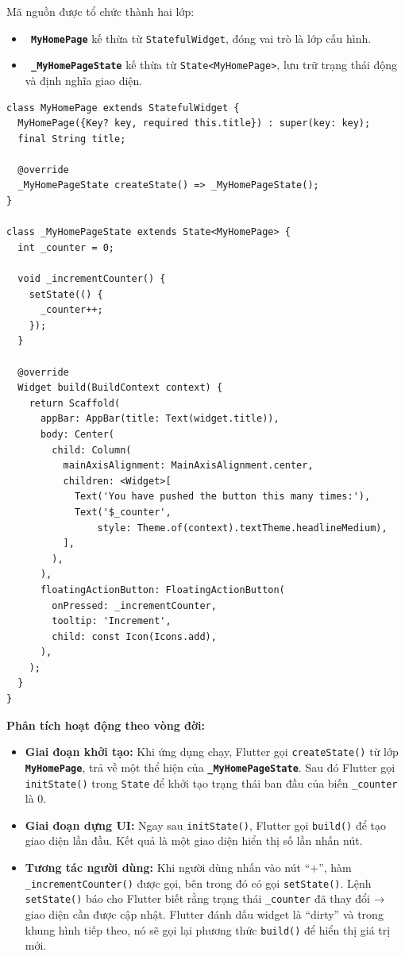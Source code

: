 \documentclass[../DoAn.tex]{subfiles}
\numberwithin{figure}{chapter}
\begin{document}
\begin{adjustwidth}{1em}{0pt}
Mã nguồn được tổ chức thành hai lớp:
\begin{itemize}
\item \textbf{\texttt{ MyHomePage}} kế thừa từ \texttt{StatefulWidget}, đóng vai trò là lớp cấu hình.
\item \textbf{\texttt{ \_MyHomePageState}} kế thừa từ \texttt{State<MyHomePage>}, lưu trữ trạng thái động và định nghĩa giao diện.
\end{itemize}

\begin{lstlisting}
class MyHomePage extends StatefulWidget {
  MyHomePage({Key? key, required this.title}) : super(key: key);
  final String title;

  @override
  _MyHomePageState createState() => _MyHomePageState();
}

class _MyHomePageState extends State<MyHomePage> {
  int _counter = 0;

  void _incrementCounter() {
    setState(() {
      _counter++;
    });
  }

  @override
  Widget build(BuildContext context) {
    return Scaffold(
      appBar: AppBar(title: Text(widget.title)),
      body: Center(
        child: Column(
          mainAxisAlignment: MainAxisAlignment.center,
          children: <Widget>[
            Text('You have pushed the button this many times:'),
            Text('$_counter',
                style: Theme.of(context).textTheme.headlineMedium),
          ],
        ),
      ),
      floatingActionButton: FloatingActionButton(
        onPressed: _incrementCounter,
        tooltip: 'Increment',
        child: const Icon(Icons.add),
      ),
    );
  }
}
\end{lstlisting} 
\end{adjustwidth}

\textbf{Phân tích hoạt động theo vòng đời:}

\begin{itemize}
\item \textbf{Giai đoạn khởi tạo: } Khi ứng dụng chạy, Flutter gọi  \texttt{createState()} từ lớp \textbf{\texttt{MyHomePage}}, trả về một thể hiện của \textbf{\texttt{\_MyHomePageState}}. Sau đó Flutter gọi \texttt{initState()} trong \texttt{State} để khởi tạo trạng thái ban đầu của biến \texttt{\_counter} là 0.
\item \textbf{Giai đoạn dựng UI: } Ngay sau \texttt{initState()}, Flutter gọi \texttt{build()} để tạo giao diện lần đầu. Kết quả là một giao diện hiển thị số lần nhấn nút.
\item \textbf{Tương tác người dùng: } Khi người dùng nhấn vào nút “+”, hàm \texttt{\_incrementCounter()} được gọi, bên trong đó có gọi \texttt{setState()}. Lệnh \texttt{setState()} báo cho Flutter biết rằng trạng thái \texttt{\_counter} đã thay đổi → giao diện cần được cập nhật. Flutter đánh dấu widget là “dirty” và trong khung hình tiếp theo, nó sẽ gọi lại phương thức \texttt{build()} để hiển thị giá trị mới.
\end{itemize}
\end{document}
